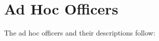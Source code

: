 %
%
%

\section{Ad Hoc Officers}\label{sec:AdHocOfficers} The ad hoc officers and their descriptions follow:\\

